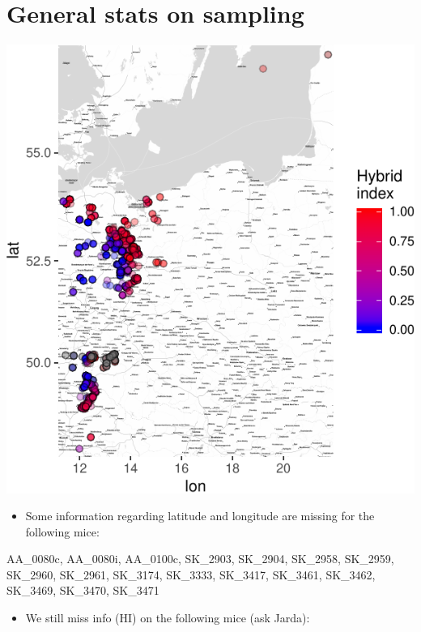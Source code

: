 \documentclass[]{article}
\providecommand{\tightlist}{%
  \setlength{\itemsep}{0pt}\setlength{\parskip}{0pt}}
\begin{document}
\section{General stats on sampling}\label{general-stats-on-sampling}

\includegraphics{Data_Analysis_Alice_files/figure-latex/generalstats-1.pdf}

\begin{itemize}
\tightlist
\item
  Some information regarding latitude and longitude are missing for the
  following mice:
\end{itemize}

AA\_0080c, AA\_0080i, AA\_0100c, SK\_2903, SK\_2904, SK\_2958, SK\_2959,
SK\_2960, SK\_2961, SK\_3174, SK\_3333, SK\_3417, SK\_3461, SK\_3462,
SK\_3469, SK\_3470, SK\_3471

\begin{itemize}
\tightlist
\item
  We still miss info (HI) on the following mice (ask Jarda):
\end{itemize}
\end{document}
